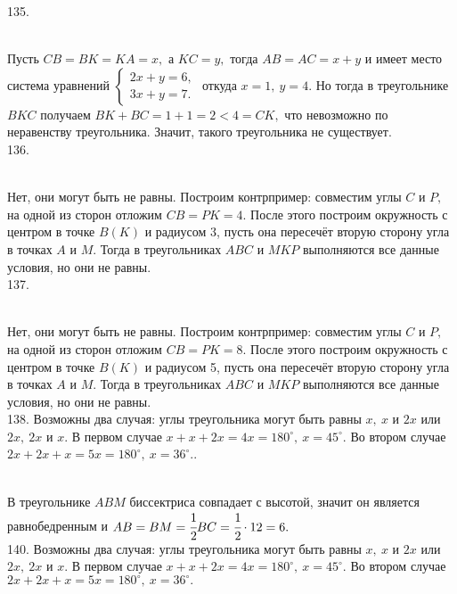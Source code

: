 135. \begin{figure}[ht!]
\end{figure}\\
Пусть $CB=BK=KA=x,$ а $KC=y,$ тогда $AB=AC=x+y$ и имеет место система уравнений $\begin{cases} 2x+y=6,\\ 3x+y=7.\end{cases}$ откуда $x=1,\ y=4.$ Но тогда в треугольнике $BKC$ получаем $BK+BC=1+1=2<4=CK,$ что невозможно по неравенству треугольника. Значит, такого треугольника не существует.\\
136. \begin{figure}[ht!]
\end{figure}\\
Нет, они могут быть не равны. Построим контрпример: совместим углы $C$ и $P,$ на одной из сторон отложим $CB=PK=4.$ После этого построим окружность с центром в точке $B(K)$ и радиусом 3, пусть она пересечёт вторую сторону угла в точках $A$ и $M.$ Тогда в треугольниках $ABC$ и $MKP$ выполняются все данные условия, но они не равны.\\
137. \begin{figure}[ht!]
\end{figure}\\
Нет, они могут быть не равны. Построим контрпример: совместим углы $C$ и $P,$ на одной из сторон отложим $CB=PK=8.$ После этого построим окружность с центром в точке $B(K)$ и радиусом 5, пусть она пересечёт вторую сторону угла в точках $A$ и $M.$ Тогда в треугольниках $ABC$ и $MKP$ выполняются все данные условия, но они не равны.\\
138. Возможны два случая: углы треугольника могут быть равны $x,\ x$ и $2x$ или $2x,\ 2x$ и $x.$ В первом случае $x+x+2x=4x=180^\circ,\ x=45^\circ.$ Во втором случае $2x+2x+x=5x=180^\circ,\ x=36^\circ.$\newpage{}. \begin{figure}[ht!]
\end{figure}\\
В треугольнике $ABM$ биссектриса совпадает с высотой, значит он является равнобедренным и $AB=BM=\cfrac{1}{2}BC=\cfrac{1}{2}\cdot12=6.$\\
140. Возможны два случая: углы треугольника могут быть равны $x,\ x$ и $2x$ или $2x,\ 2x$ и $x.$ В первом случае $x+x+2x=4x=180^\circ,\ x=45^\circ.$ Во втором случае $2x+2x+x=5x=180^\circ,\ x=36^\circ.$\\
